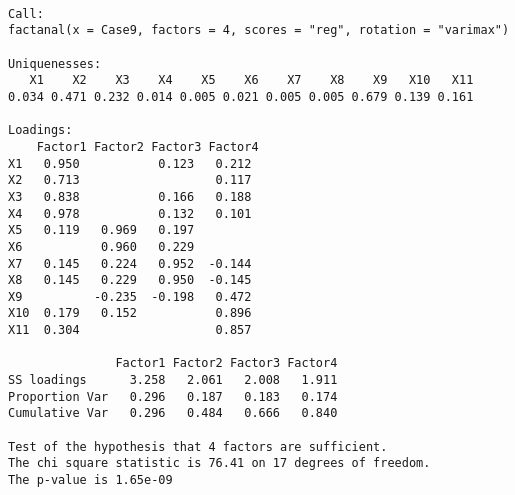 \documentclass[UTF8,a4paper]{ctexart}
\begin{document}
    
    \begin{Verbatim}[commandchars=\\\{\}]

Call:
factanal(x = Case9, factors = 4, scores = "reg", rotation = "varimax")

Uniquenesses:
   X1    X2    X3    X4    X5    X6    X7    X8    X9   X10   X11 
0.034 0.471 0.232 0.014 0.005 0.021 0.005 0.005 0.679 0.139 0.161 

Loadings:
    Factor1 Factor2 Factor3 Factor4
X1   0.950           0.123   0.212 
X2   0.713                   0.117 
X3   0.838           0.166   0.188 
X4   0.978           0.132   0.101 
X5   0.119   0.969   0.197         
X6           0.960   0.229         
X7   0.145   0.224   0.952  -0.144 
X8   0.145   0.229   0.950  -0.145 
X9          -0.235  -0.198   0.472 
X10  0.179   0.152           0.896 
X11  0.304                   0.857 

               Factor1 Factor2 Factor3 Factor4
SS loadings      3.258   2.061   2.008   1.911
Proportion Var   0.296   0.187   0.183   0.174
Cumulative Var   0.296   0.484   0.666   0.840

Test of the hypothesis that 4 factors are sufficient.
The chi square statistic is 76.41 on 17 degrees of freedom.
The p-value is 1.65e-09 
    \end{Verbatim}
\end{document}
